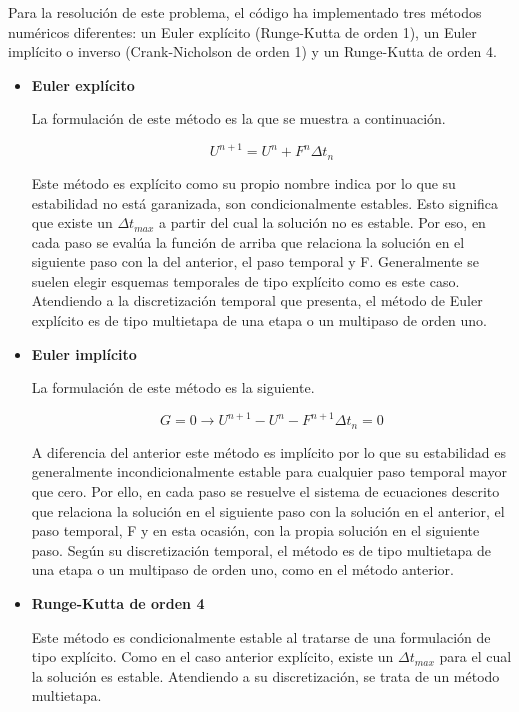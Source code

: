 \documentclass{article}
\begin{document}
	Para la resolución de este problema, el código ha implementado tres métodos numéricos diferentes: un Euler explícito (Runge-Kutta de orden 1), un Euler implícito o inverso (Crank-Nicholson de orden 1) y un Runge-Kutta de orden 4.
	
	\begin{itemize}
		\item \textbf{Euler explícito}
		
		La formulación de este método es la que se muestra a continuación.
		
		$$U^{n+1}=U^n+F^n\Delta t_n$$
		
		Este método es explícito como su propio nombre indica por lo que su estabilidad no está garanizada, son condicionalmente estables. Esto significa que existe un $\Delta t_{max}$ a partir del cual la solución no es estable. Por eso, en cada paso se evalúa la función de arriba que relaciona la solución en el siguiente paso con la del anterior, el paso temporal y F. Generalmente se suelen elegir esquemas temporales de tipo explícito como es este caso. Atendiendo a la discretización temporal que presenta, el método de Euler explícito es de tipo multietapa de una etapa o un multipaso de orden uno.
		
		\item \textbf{Euler implícito}
		
		La formulación de este método es la siguiente.
		
		$$G=0\rightarrow U^{n+1}-U^n-F^{n+1}\Delta t_n=0$$
		
		A diferencia del anterior este método es implícito por lo que su estabilidad es generalmente incondicionalmente estable para cualquier paso temporal mayor que cero. Por ello, en cada paso se resuelve el sistema de ecuaciones descrito que relaciona la solución en el siguiente paso con la solución en el anterior, el paso temporal, F y en esta ocasión, con la propia solución en el siguiente paso. Según su discretización temporal, el método es de tipo multietapa de una etapa o un multipaso de orden uno, como en el método anterior.
		
		\item \textbf{Runge-Kutta de orden 4}
		
		Este método es condicionalmente estable al tratarse de una formulación de tipo explícito. Como en el caso anterior explícito, existe un $\Delta t_{max}$ para el cual la solución es estable. Atendiendo a su discretización, se trata de un método multietapa.
		
	\end{itemize}
\end{document}
